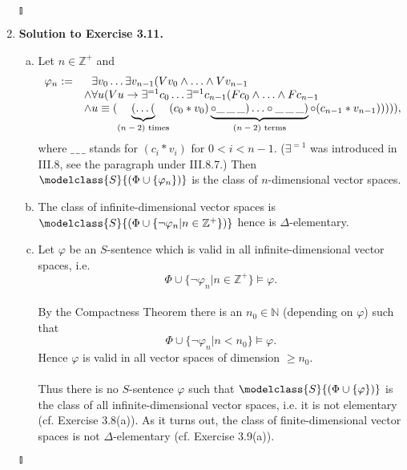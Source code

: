 \begin{enumerate}[1.]
\begin{enumerate}[(a)]
\end{enumerate} \begin{flushright}$\talloblong$\end{flushright}
%
\item \textbf{Solution to Exercise 3.11.}
\begin{enumerate}[(a)]
\item Let $n \in \mathbb{Z}^+$ and
\[
\begin{array}{ll}
\varphi_n := & \phantom{\land} \exists v_0 \ldots \exists v_{n-1}(Vv_0 \land \ldots \land Vv_{n-1} \cr
\ & \land \forall u(Vu \rightarrow \exists^{=1}c_0 \ldots \exists^{=1}c_{n-1}(Fc_0 \land \ldots \land Fc_{n-1} \cr
\ & \land u \equiv ( \underbrace{(\ldots (}_{\mbox{\scriptsize $(n-2)$ times}} (c_0 * v_0) \underbrace{\circ \_\,\_\,\_ ) \ldots  \circ \_\,\_\,\_ )}_{\mbox{\scriptsize $(n-2)$ terms}} \circ (c_{n-1} * v_{n-1})) ))),
\end{array}
\]
where $\_\,\_\,\_$ stands for $(c_i * v_i)$ for $0 < i < n-1$. ($\exists^{=1}$ was introduced in III.8, see the paragraph under III.8.7.) Then $\modelclass{S}{(\Phi \cup \{ \varphi_n \})}$ is the class of $n$-dimensional vector spaces.
\item The class of infinite-dimensional vector spaces is $\modelclass{S}{(\Phi \cup \{ \neg \varphi_n | n \in \mathbb{Z}^+ \})}$ hence is $\Delta$-elementary.
\item Let $\varphi$ be an $S$-sentence which is valid in all infinite-dimensional vector spaces, i.e.
\[
\Phi \cup \{ \neg \varphi_n | n \in \mathbb{Z}^+ \} \models \varphi.
\]\ 
\\
By the Compactness Theorem there is an $n_0 \in \mathbb{N}$ (depending on $\varphi$) such that
\[
\Phi \cup \{ \neg \varphi_n | n < n_0 \} \models \varphi.
\]
Hence $\varphi$ is valid in all vector spaces of dimension $\geq n_0$.\\
\\
Thus there is no $S$-sentence $\varphi$ such that $\modelclass{S}{(\Phi \cup \{ \varphi \})}$ is the class of all infinite-dimensional vector spaces, i.e. it is not elementary (cf. Exercise 3.8(a)). As it turns out, the class of finite-dimensional vector spaces is not $\Delta$-elementary (cf. Exercise 3.9(a)).
\end{enumerate} \begin{flushright}$\talloblong$\end{flushright}
\end{enumerate}
